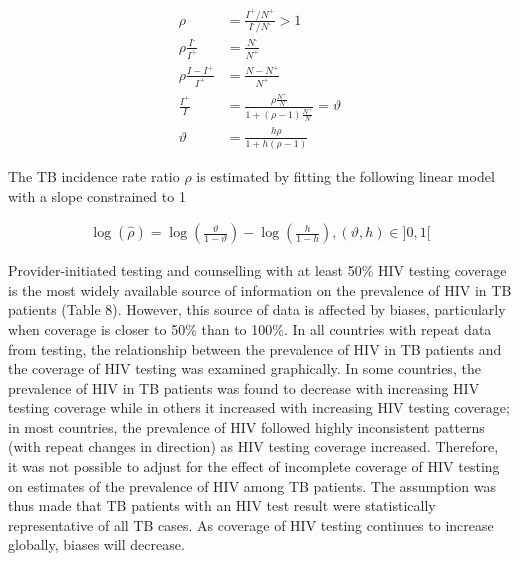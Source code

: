 \begin{equation}
\begin{align}
\rho &= \frac{I^{\textrm{+}}/N^{\textrm{+}}}{I^{\textrm{-}}/N^{\textrm{-}}} > 1    \\
\rho \frac{I^{\textrm{-}}}{I^{\textrm{+}}} &= \frac{N^{\textrm{-}}}{N^{\textrm{+}}}  \\
\rho \frac{I - I^{\textrm{+}}}{I^{\textrm{+}}} &= \frac{N - N^{\textrm{+}}}{N^{\textrm{+}}} \\
\frac{I^{\textrm{+}}}{I} &= \frac{\rho \frac{N^{\textrm{+}}}{N}}{1 + (\rho - 1)\frac{N^{\textrm{+}}}{N}} = \vartheta \\
\vartheta &= \frac{h \rho}{1 + h(\rho - 1)}
\label{eqn:rho}
\end{align}
\end{equation}

The TB incidence rate ratio $\rho$ is estimated by fitting the following linear model with a slope constrained to 1

\begin{align}
\log(\hat{\rho}) = \log \left(\frac{\vartheta}{1-\vartheta}\right) - \log \left(\frac{h}{1-h}\right), (\vartheta, h) \in {]0,1[}
\label{eqn:irr}
\end{align}

Provider-initiated testing and counselling with at least 50\% HIV testing coverage is the most widely available source of information on the prevalence of HIV in TB patients (Table 8). However, this source of data is affected by biases, particularly when coverage is closer to 50\% than to 100\%. In all countries with repeat data from testing, the relationship between the prevalence of HIV in TB patients and the coverage of HIV testing was examined graphically. In some countries, the prevalence of HIV in TB patients was found to decrease with increasing HIV testing coverage while in others it increased with increasing HIV testing coverage; in most countries, the prevalence of HIV followed highly inconsistent patterns (with repeat changes in direction) as HIV testing coverage increased. Therefore, it was not possible to adjust for the effect of incomplete coverage of HIV testing on estimates of the prevalence of HIV among TB patients. The assumption was thus made that TB patients with an HIV test result were statistically representative of all TB cases. As coverage of HIV testing continues to increase globally, biases will decrease. 



